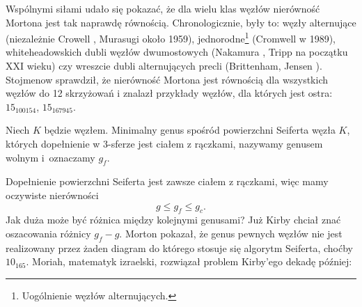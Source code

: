 Wspólnymi siłami udało się pokazać, że dla wielu klas węzłów nierówność Mortona jest tak naprawdę równością.
Chronologicznie, były to: węzły alternujące (niezależnie Crowell \cite{crowellrichard59}, Murasugi \cite{murasugi58} około 1959),
%
%
%
jednorodne\footnote{Uogólnienie węzłów alternujących.} (Cromwell \cite{cromwell89} w 1989),
%
%
whiteheadowskich dubli węzłów dwumostowych (Nakamura \cite{nakamura06}, Tripp \cite{tripp02} na początku XXI wieku)
%
%
%
%
czy wreszcie dubli alternujących precli (Brittenham, Jensen \cite{brittenham06}).
%
%
%
Stojmenow \cite{stoimenow02} sprawdził, że nierówność Mortona jest równością dla wszystkich węzłów do 12 skrzyżowań i znalazł przykłady węzłów, dla których jest ostra: $15_{100154}$, $15_{167945}$.
%

\begin{definition}
%
%
    Niech $K$ będzie węzłem.
    Minimalny genus spośród powierzchni Seiferta węzła $K$, których dopełnienie w 3-sferze jest ciałem z rączkami, nazywamy genusem wolnym i~oznaczamy $g_f$.
\end{definition}

Dopełnienie powierzchni Seiferta jest zawsze ciałem z rączkami, więc mamy oczywiste nierówności
\begin{equation}
    g \le g_f \le g_c.
\end{equation}
Jak duża może być różnica między kolejnymi genusami?
Już Kirby \cite[problem 1.20a]{kirby78} chciał znać oszacowania różnicy $g_f - g$.
Morton \cite{morton86} pokazał, że genus pewnych węzłów nie jest realizowany przez żaden diagram do którego stosuje się algorytm Seiferta, choćby $10_{165}$.
%
Moriah, matematyk izraelski, rozwiązał problem Kirby'ego dekadę później:
%

